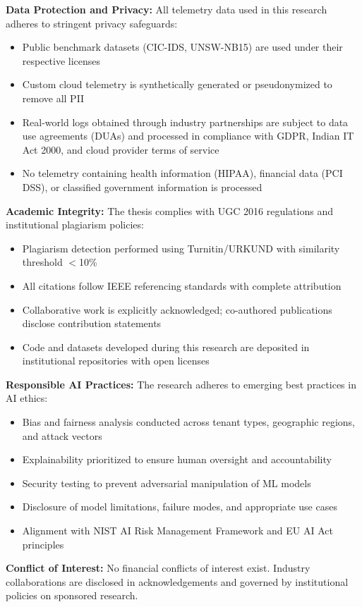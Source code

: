 \textbf{Data Protection and Privacy:} All telemetry data used in this research adheres to stringent privacy safeguards:
\begin{itemize}
    \item Public benchmark datasets (CIC-IDS, UNSW-NB15) are used under their respective licenses
    \item Custom cloud telemetry is synthetically generated or pseudonymized to remove all PII
    \item Real-world logs obtained through industry partnerships are subject to data use agreements (DUAs) and processed in compliance with GDPR, Indian IT Act 2000, and cloud provider terms of service
    \item No telemetry containing health information (HIPAA), financial data (PCI DSS), or classified government information is processed
\end{itemize}

\textbf{Academic Integrity:} The thesis complies with UGC 2016 regulations and institutional plagiarism policies:
\begin{itemize}
    \item Plagiarism detection performed using Turnitin/URKUND with similarity threshold $<$10\%
    \item All citations follow IEEE referencing standards with complete attribution
    \item Collaborative work is explicitly acknowledged; co-authored publications disclose contribution statements
    \item Code and datasets developed during this research are deposited in institutional repositories with open licenses
\end{itemize}

\textbf{Responsible AI Practices:} The research adheres to emerging best practices in AI ethics:
\begin{itemize}
    \item Bias and fairness analysis conducted across tenant types, geographic regions, and attack vectors
    \item Explainability prioritized to ensure human oversight and accountability
    \item Security testing to prevent adversarial manipulation of ML models
    \item Disclosure of model limitations, failure modes, and appropriate use cases
    \item Alignment with NIST AI Risk Management Framework and EU AI Act principles
\end{itemize}

\textbf{Conflict of Interest:} No financial conflicts of interest exist. Industry collaborations are disclosed in acknowledgements and governed by institutional policies on sponsored research.

